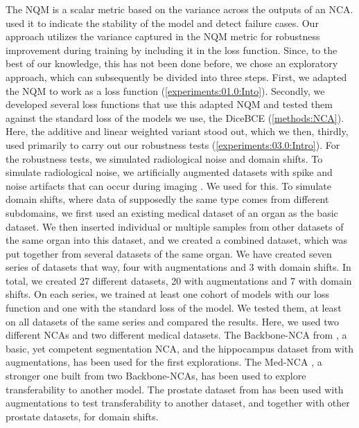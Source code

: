 The NQM is a scalar metric based on the variance across the outputs of an NCA. \cite{kalkhof:2023:M3D-NCA} used it to indicate the stability of the model and detect failure cases. Our approach utilizes the variance captured in the NQM metric for robustness improvement during training by including it in the loss function. Since, to the best of our knowledge, this has not been done before, we chose an exploratory approach, which can subsequently be divided into three steps. First, we adapted the NQM to work as a loss function (\autoref{experiments:01.0:Into}). Secondly, we developed several loss functions that use this adapted NQM and tested them against the standard loss of the models we use, the DiceBCE (\autoref{methods:NCA}). Here, the additive and linear weighted variant stood out, which we then, thirdly, used primarily to carry out our robustness tests (\autoref{experiments:03.0:Intro}).
For the robustness tests, we simulated radiological noise and domain shifts. To simulate radiological noise, we artificially augmented datasets with spike and noise artifacts that can occur during imaging \cite{Yan:2019:DomainShiftsInMedSeg, Zhou:2023:DomainGeneralization_alsoAugmentation}. We used \cite{torchIO} for this. To simulate domain shifts, where data of supposedly the same type comes from different subdomains,
we first used an existing medical dataset of an organ as the basic dataset. We then inserted individual or multiple samples from other datasets of the same organ into this dataset, and we created a combined dataset, which was put together from several datasets of the same organ. We have created seven series of datasets that way, four with augmentations and 3 with domain shifts. In total, we created 27 different datasets, 20 with augmentations and 7 with domain shifts. On each series, we trained at least one cohort of models with our loss function and one with the standard loss of the model. We tested them, at least on all datasets of the same series and compared the results.
Here, we used two different NCAs and two different medical datasets. The Backbone-NCA from \cite{kalkhof:2023:medNCA}, a basic, yet competent segmentation NCA, and the hippocampus dataset from \cite{Antonelli:2022:MedSegmentationDecatlon} with augmentations, has been used for the first explorations. The Med-NCA \cite{kalkhof:2023:medNCA}, a stronger one built from two Backbone-NCAs, has been used to explore transferability to another model. The prostate dataset from \cite{Antonelli:2022:MedSegmentationDecatlon} has been used with augmentations to test transferability to another dataset, and together with other prostate datasets, for domain shifts.
